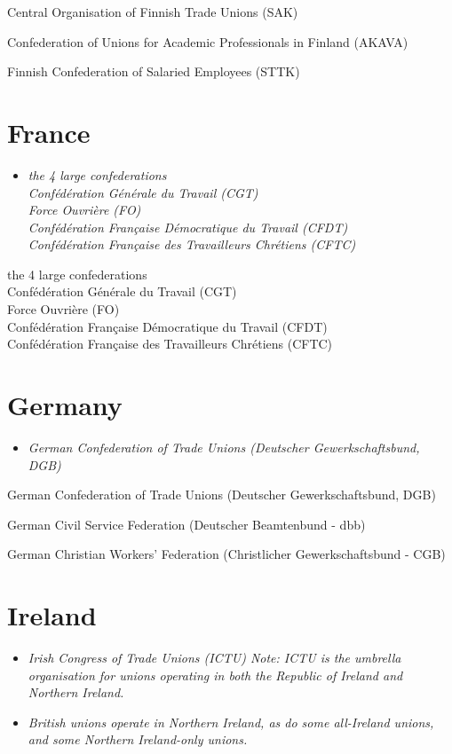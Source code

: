 Central Organisation of Finnish Trade Unions (SAK)

Confederation of Unions for Academic Professionals in Finland (AKAVA)

Finnish Confederation of Salaried Employees (STTK)

\section{France}\label{france}

\begin{itemize}
\item
  \emph{the 4 large confederations\\
  Confédération Générale du Travail (CGT)\\
  Force Ouvrière (FO)\\
  Confédération Française Démocratique du Travail (CFDT)\\
  Confédération Française des Travailleurs Chrétiens (CFTC)}
\end{itemize}

the 4 large confederations\\
Confédération Générale du Travail (CGT)\\
Force Ouvrière (FO)\\
Confédération Française Démocratique du Travail (CFDT)\\
Confédération Française des Travailleurs Chrétiens (CFTC)

\section{Germany}\label{germany}

\begin{itemize}
\item
  \emph{German Confederation of Trade Unions (Deutscher
  Gewerkschaftsbund, DGB)}
\end{itemize}

German Confederation of Trade Unions (Deutscher Gewerkschaftsbund, DGB)

German Civil Service Federation (Deutscher Beamtenbund - dbb)

German Christian Workers' Federation (Christlicher Gewerkschaftsbund -
CGB)

\section{Ireland}\label{ireland}

\begin{itemize}
\item
  \emph{Irish Congress of Trade Unions (ICTU) Note: ICTU is the umbrella
  organisation for unions operating in both the Republic of Ireland and
  Northern Ireland.}
\item
  \emph{British unions operate in Northern Ireland, as do some
  all-Ireland unions, and some Northern Ireland-only unions.}
\end{itemize}

